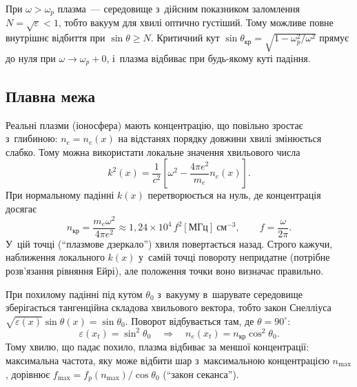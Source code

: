 При $\omega>\omega_p$ плазма~--- середовище з~дійсним показником заломлення
$N=\sqrt\varepsilon<1$, тобто вакуум для хвилі оптично густіший. Тому можливе повне
внутрішнє відбиття при $\sin\theta\geq N$. Критичний кут
$\sin\theta_{\mathrm{кр}}=\sqrt{1-\omega_p^2/\omega^2}$ прямує до нуля при
$\omega\to\omega_p+0$, і~плазма відбиває при будь-якому куті падіння.

\subsection*{Плавна межа}

Реальні плазми (іоносфера) мають концентрацію, що повільно зростає з~глибиною:
$n_e=n_e(x)$ на відстанях порядку довжини хвилі змінюється слабко. Тому можна використати
локальне значення хвильового числа
\begin{equation*}
	k^2(x)=\frac1{c^2}\left[\omega^2-\frac{4\pi e^2}{m_e}n_e(x)\right].
\end{equation*}
При нормальному падінні $k(x)$ перетворюється на нуль, де концентрація досягає
\begin{equation}\label{eq:critical-density}
	n_{\mathrm{кр}}=\frac{m_e\omega^2}{4\pi e^2}\approx1{,}24\times10^{4}\,f^2[\mathrm{МГц}]~\mathrm{см}^{-3},\qquad f=\frac\omega{2\pi}.
\end{equation}
У~цій точці (\enquote{плазмове дзеркало}) хвиля повертається назад. Строго кажучи,
наближення локального $k(x)$ у~самій точці повороту непридатне (потрібне розв'язання
рівняння Ейрі), але положення точки воно визначає правильно.

При похилому падінні під кутом $\theta_0$ з~вакууму в~шарувате середовище зберігається
тангенційна складова хвильового вектора, тобто закон Снелліуса
$\sqrt{\varepsilon(x)}\sin\theta(x)=\sin\theta_0$. Поворот відбувається там, де
$\theta=90^\circ$:
\begin{equation*}
	\varepsilon(x_t)=\sin^2\theta_0\quad\Rightarrow\quad n_e(x_t)=n_{\mathrm{кр}}\cos^2\theta_0.
\end{equation*}
Тому хвилю, що падає похило, плазма відбиває за меншої концентрації: максимальна частота,
яку може відбити шар з~максимальною концентрацією $n_{\max}$, дорівнює
$f_{\max}=f_p(n_{\max})/\cos\theta_0$ (\enquote{закон секанса}).

